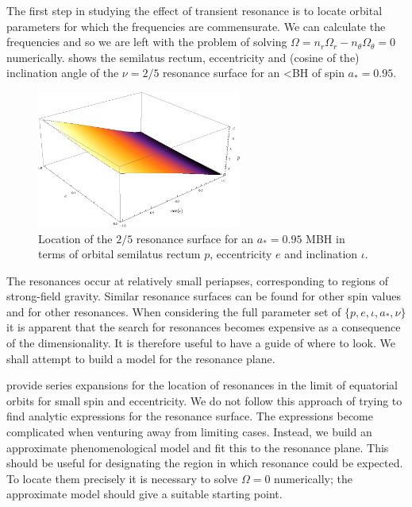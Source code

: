 The first step in studying the effect of transient resonance is to locate orbital parameters for which the frequencies are commensurate. We can calculate the frequencies and so we are left with the problem of solving $\Omega = n_r \Omega_r - n_\theta \Omega_\theta = 0$ numerically.  shows the semilatus rectum, eccentricity and (cosine of the) inclination angle of the $\nu = 2/5$ resonance surface for an <BH of spin $a_\ast = 0.95$. 
\begin{figure}%
\centering
\includegraphics[width=0.6\textwidth]{./images/Fig_res-2-5-95}
\caption{Location of the $2/5$ resonance surface for an $a_\ast = 0.95$ MBH in terms of orbital semilatus rectum $p$, eccentricity $e$ and inclination $\iota$.}\label{fig:res-plane-2-5-95}
\end{figure}
The resonances occur at relatively small periapses, corresponding to regions of strong-field gravity.
Similar resonance surfaces can be found for other spin values and for other resonances. When considering the full parameter set of $\{p,e,\iota,a_\ast,\nu\}$ it is apparent that the search for resonances becomes expensive as a consequence of the dimensionality. It is therefore useful to have a guide of where to look. We shall attempt to build a model for the resonance plane.

\citet{Brink2013} provide series expansions for the location of resonances in the limit of equatorial orbits for small spin and eccentricity. We do not follow this approach of trying to find analytic expressions for the resonance surface. The expressions become complicated when venturing away from limiting cases. Instead, we build an approximate phenomenological model and fit this to the resonance plane.%
This should be useful for designating the region in which resonance could be expected. To locate them precisely it is necessary to solve $\Omega = 0$ numerically; the approximate model should give a suitable starting point.

